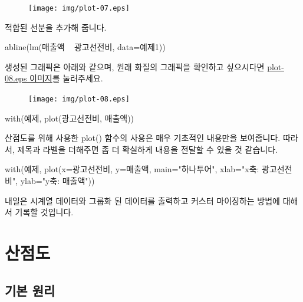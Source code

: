 \begin{figure}
\begin{center}
\texttt{[image: img/plot-07.eps]}
\end{center}
\end{figure}

적합된 선분을 추가해 줍니다. 
\begin{Schunk}
\begin{Soutput}	
abline(lm(매출액 ~ 광고선전비, data=예제1))
\end{Soutput}
\end{Schunk}
생성된 그래픽은 아래와 같으며, 원래 화질의 그래픽을 확인하고 싶으시다면 \href{http://korea.gnu.org/gnustats/img/plot-08.eps}{plot-08.eps 이미지}를 눌러주세요. 

\begin{figure}
\begin{center}
\texttt{[image: img/plot-08.eps]}
\end{center}
\end{figure}

\begin{Schunk}
\begin{Soutput}
with(예제, plot(광고선전비, 매출액))
\end{Soutput}
\end{Schunk}

산점도를 위해 사용한 plot() 함수의 사용은 매우 기초적인 내용만을 보여줍니다. 
따라서, 제목과 라벨을 더해주면 좀 더 확실하게 내용을 전달할 수 있을 것 같습니다. 

\begin{Schunk}
\begin{Soutput}
with(예제, plot(x=광고선전비, y=매출액, main="하나투어", xlab="x축: 광고선전비", ylab="y축: 매출액"))
\end{Soutput}
\end{Schunk}

내일은 시계열 데이터와 그룹화 된 데이터를 출력하고 커스터 마이징하는 방법에 대해서 기록할 것입니다.

\section{산점도}

\subsection{기본 원리}

